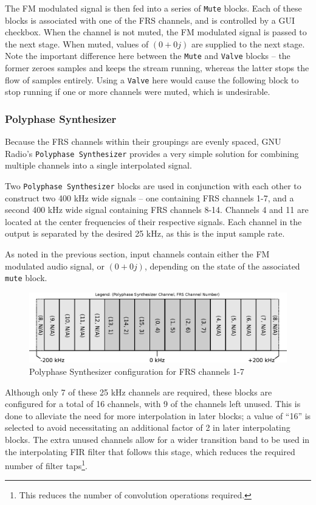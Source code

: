 The FM modulated signal is then fed into a series of \texttt{Mute} blocks. Each
of these blocks is associated with one of the \ac{FRS} channels, and is
controlled by a \ac{GUI} checkbox. When the channel is not muted, the FM modulated
signal is passed to the next stage. When muted, values of $(0 + 0j)$ are
supplied to the next stage. Note the important difference here between the
\texttt{Mute} and \texttt{Valve} blocks -- the former zeroes samples and keeps
the stream running, whereas the latter stops the flow of samples entirely.
Using a \texttt{Valve} here would cause the following block to stop running if
one or more channels were muted, which is undesirable.

\subsubsection{Polyphase Synthesizer} \label{sec:polysynth}
Because the \ac{FRS} channels within their groupings are evenly spaced,
GNU Radio's \texttt{Polyphase Synthesizer} \cite{TRONDEAU_PFB} provides a very
simple solution for combining multiple channels into a single interpolated signal.

Two \texttt{Polyphase Synthesizer} blocks are used in conjunction with each other to
construct two 400 kHz wide signals -- one containing \ac{FRS} channels 1-7, and a second
400 kHz wide signal containing \ac{FRS} channels 8-14. Channels 4 and 11 are
located at the center frequencies of their respective signals. Each channel in
the output is separated by the desired 25 kHz, as this is the input sample rate.

As noted in the previous section, input channels contain either the FM
modulated audio signal, or $(0 + 0j)$, depending on the state of the associated
\texttt{mute} block.

\begin{figure}[h!]
  \centering
  \includegraphics[scale=0.85]{images/frs/polyphase_synth_ch1-7.eps}
  \caption{Polyphase Synthesizer configuration for FRS channels 1-7}
  \label{fig:polyphasesynth}
\end{figure}

Although only 7 of these 25 kHz channels are required, these blocks are
configured for a total of 16 channels, with 9 of the channels left unused. This
is done to alleviate the need for more interpolation in later blocks; a
value of ``16'' is selected to avoid necessitating an additional factor of 2
in later interpolating blocks.  The extra unused channels
allow for a wider transition band to be used in the interpolating \ac{FIR}
filter that follows this stage, which reduces the required number of filter
taps\footnote{This reduces the number of convolution operations required.}.

